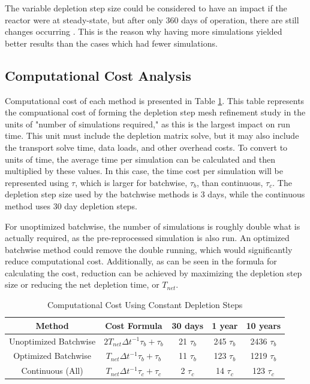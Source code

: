 The variable depletion step size could be considered to have an impact if the reactor were at steady-state, but after only 360 days of operation, there are still changes occurring \cite{rykhlevskii_advanced_2018}. This is the reason why having more simulations yielded better results than the cases which had fewer simulations.

\subsection{Computational Cost Analysis}

Computational cost of each method is presented in Table \ref{tab:comp-cost-methods-1}.
This table represents the compuational cost of forming the depletion step mesh refinement study in the units of "number of simulations required," as this is the largest impact on run time. This unit must include the depletion matrix solve, but it may also include the transport solve time, data loads, and other overhead costs. To convert to units of time, the average time per simulation can be calculated and then multiplied by these values. In this case, the time cost per simulation will be represented using $\tau$, which is larger for batchwise, $\tau_{b}$, than continuous, $\tau_{c}$.
The depletion step size used by the batchwise methods is 3 days, while the continuous method uses 30 day depletion steps.

For unoptimized batchwise, the number of simulations is roughly double what is actually required, as the pre-reprocessed simulation is also run. An optimized batchwise method could remove the double running, which would significantly reduce computational cost. Additionally, as can be seen in the formula for calculating the cost, reduction can be achieved by maximizing the depletion step size or reducing the net depletion time, or $T_{net}$.

\begin{table}[H]
\renewcommand{\arraystretch}{1.25}
\caption{Computational Cost Using Constant Depletion Steps}
\label{tab:comp-cost-methods-1}
\begin{center}
\begin{tabular}{ c | c | c | c | c }
 \hline
 Method & Cost Formula & 30 days & 1 year & 10 years\\
 \hline
 \hline
 Unoptimized Batchwise & $2 T_{net} \Delta t^{-1} \tau_{b} + \tau_{b}$ & 21 $\tau_{b}$ & 245 $\tau_{b}$ & 2436 $\tau_{b}$ \\
 Optimized Batchwise & $T_{net} \Delta t^{-1} \tau_{b} + \tau_{b}$ & 11 $\tau_{b}$ & 123 $\tau_{b}$ & 1219 $\tau_{b}$\\
 Continuous (All) & $T_{net} \Delta t^{-1} \tau_{c} + \tau_{c}$ & 2 $\tau_{c}$ & 14 $\tau_{c}$ & 123 $\tau_{c}$\\
 \hline
\end{tabular}
\end{center}
\end{table}

